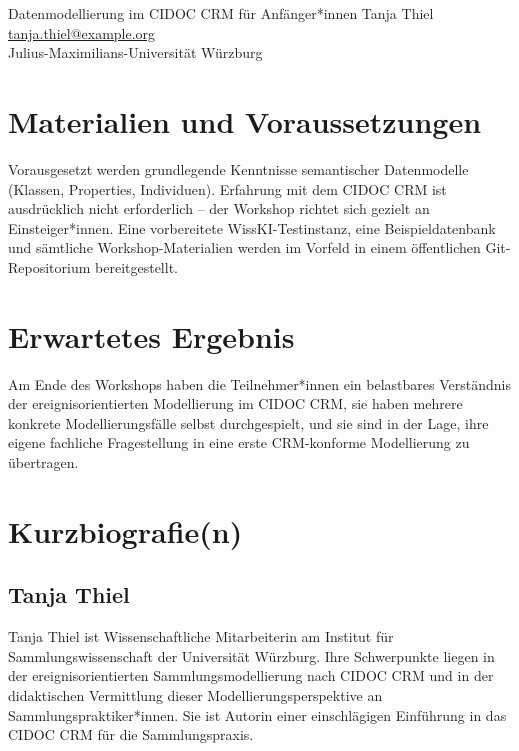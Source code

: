 \begin{beitrag}{Datenmodellierung im CIDOC CRM für Anfänger*innen}{%
Tanja Thiel\, \\
\small \href{mailto:tanja.thiel@example.org}{tanja.thiel@example.org} \\
\small Julius-Maximilians-Universität Würzburg
}
\section{Materialien und Voraussetzungen}
Vorausgesetzt werden grundlegende Kenntnisse semantischer Datenmodelle (Klassen, Properties, Individuen). Erfahrung mit dem CIDOC CRM ist ausdrücklich nicht erforderlich -- der Workshop richtet sich gezielt an Einsteiger*innen. Eine vorbereitete WissKI-Testinstanz, eine Beispieldatenbank und sämtliche Workshop-Materialien werden im Vorfeld in einem öffentlichen Git-Repositorium bereitgestellt.

\section{Erwartetes Ergebnis}
Am Ende des Workshops haben die Teilnehmer*innen ein belastbares Verständnis der ereignisorientierten Modellierung im CIDOC CRM, sie haben mehrere konkrete Modellierungsfälle selbst durchgespielt, und sie sind in der Lage, ihre eigene fachliche Fragestellung in eine erste CRM-konforme Modellierung zu übertragen.

\end{beitrag}

\section*{Kurzbiografie(n)}

\subsection*{Tanja Thiel}
Tanja Thiel ist Wissenschaftliche Mitarbeiterin am Institut für Sammlungswissenschaft der Universität Würzburg. Ihre Schwerpunkte liegen in der ereignisorientierten Sammlungsmodellierung nach CIDOC CRM und in der didaktischen Vermittlung dieser Modellierungsperspektive an Sammlungspraktiker*innen. Sie ist Autorin einer einschlägigen Einführung in das CIDOC CRM für die Sammlungspraxis.
